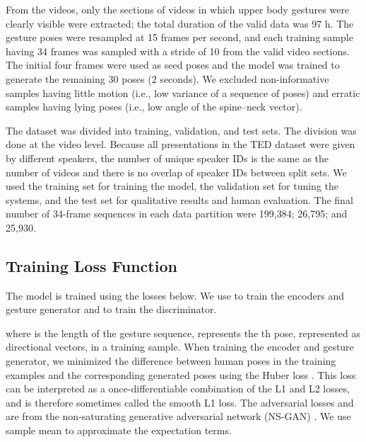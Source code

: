 \documentclass[acmtog]{acmart}
\begin{document}
From the videos, only the sections of videos in which upper body gestures were clearly visible were extracted; the total duration of the valid data was 97 h. The gesture poses were resampled at 15 frames per second, and each training sample having 34 frames was sampled with a stride of 10 from the valid video sections. The initial four frames were used as seed poses and the model was trained to generate the remaining 30 poses (2 seconds). We excluded non-informative samples having little motion (i.e., low variance of a sequence of poses) and erratic samples having lying poses (i.e., low angle of the spine--neck vector).

The dataset was divided into training, validation, and test sets. The division was done at the video level. Because all presentations in the TED dataset were given by different speakers, the number of unique speaker IDs is the same as the number of videos and there is no overlap of speaker IDs between split sets. We used the training set for training the model, the validation set for tuning the systems, and the test set for qualitative results and human evaluation. The final number of 34-frame sequences in each data partition were 199,384; 26,795; and 25,930. 

\subsection{Training Loss Function}
The model is trained using the losses below. We use  to train the encoders and gesture generator and  to train the discriminator.











\vspace{3mm}
\noindent where  is the length of the gesture sequence,  represents the th pose, represented as directional vectors, in a training sample. When training the encoder and gesture generator, we minimized the difference between human poses  in the training examples and the corresponding generated poses  using the Huber loss \cite{huber1964robust}. This loss  can be interpreted as a once-differentiable combination of the L1 and L2 losses, and is therefore sometimes called the smooth L1 loss. The adversarial losses  and  are from the non-saturating generative adversarial network (NS-GAN) \cite{goodfellow2014generative}. We use sample mean to approximate the expectation terms.
\end{document}
